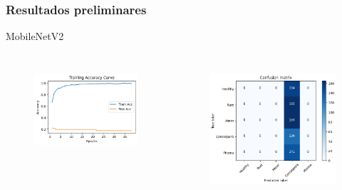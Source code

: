 \documentclass[aspectratio=169]{beamer}
\begin{document}
\begin{frame}
    \frametitle{Resultados preliminares}


    \centering
    MobileNetV2


    \begin{columns}


        \begin{figure}
            \centering
            \includegraphics[scale = 0.5]{img/MobileTrain2.png}
            \label{fig:enter-label}
        \end{figure}




        \begin{figure}
            \centering
            \includegraphics[scale = 0.5]{img/mobilematrix2.png}
            \label{fig:enter-label}
        \end{figure}



    \end{columns}

\end{frame}
\end{document}
